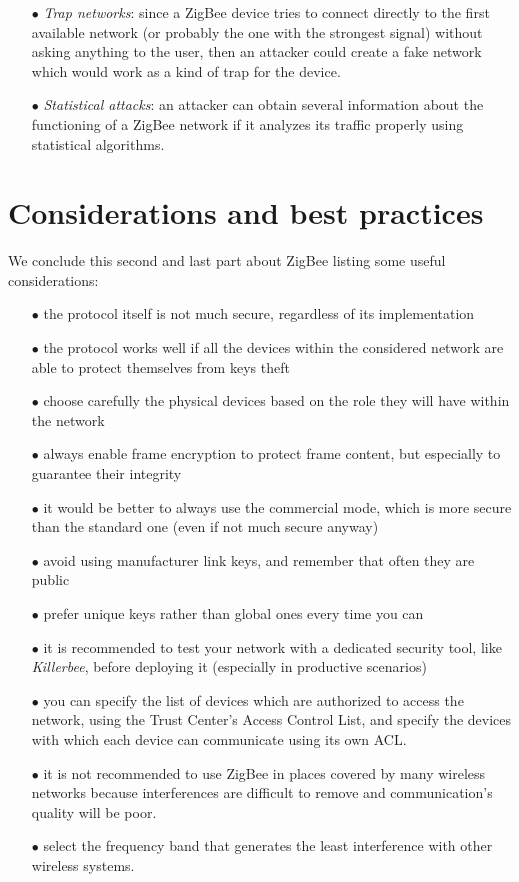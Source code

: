\documentclass[12pt]{report}
\begin{document}
{\begin{itemize}
\item[$\bullet$] \emph{Trap networks}: since a ZigBee device tries to connect directly to the first available network (or probably the one with the strongest signal) without asking anything to the user, then an attacker could create a fake network which would work as a kind of trap for the device.

\item[$\bullet$] \emph{Statistical attacks}: an attacker can obtain several information about the functioning of a ZigBee network if it analyzes its traffic properly using statistical algorithms.\\ 
\end{itemize}

\clearpage
\section{Considerations and best practices}
\bigskip
We conclude this second and last part about ZigBee listing some useful considerations:

\begin{itemize}
\setlength{\itemindent}{+4mm}
\item[$\bullet$] the protocol itself is not much secure, regardless of its implementation
\item[$\bullet$] the protocol works well if all the devices within the considered network are able to protect themselves from keys theft
\item[$\bullet$] choose carefully the physical devices based on the role they will have within the network
\item[$\bullet$] always enable frame encryption to protect frame content, but especially to guarantee their integrity
\item[$\bullet$] it would be better to always use the commercial mode, which is more secure than the standard one (even if not much secure anyway)
\item[$\bullet$] avoid using manufacturer link keys, and remember that often they are public
\item[$\bullet$] prefer unique keys rather than global ones every time you can
\item[$\bullet$] it is recommended to test your network with a dedicated security tool, like \emph{Killerbee}, before deploying it (especially in productive scenarios)
\item[$\bullet$] you can specify the list of devices which are authorized to access the network, using the Trust Center's Access Control List, and specify the devices with which each device can communicate using its own ACL.
\item[$\bullet$] it is not recommended to use ZigBee in places covered by many wireless networks because interferences are difficult to remove and communication's quality will be poor.
\item[$\bullet$] select the frequency band that generates the least interference with other wireless systems.\\
\end{itemize}

}
\end{document}
